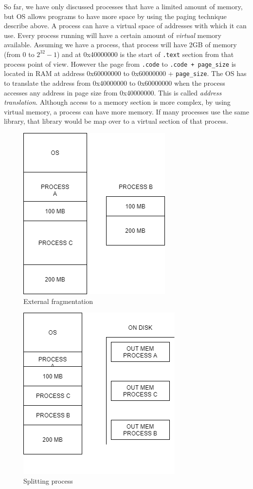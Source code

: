 So far, we have only discussed processes that have a limited amount of memory, but OS allows programs to have more space by using the paging technique describe above. A process can have a virtual space of addresses with which it can use. Every process running will have a certain amount of \textit{virtual} memory available. Assuming we have a process, that process will have 2GB of memory (from 0 to $2^{32}-1$) and at 0x40000000 is the start of \texttt{.text} section from that process point of view. However the page from \texttt{.code} to \texttt{.code + page\_size} is located in RAM at address 0x60000000 to 0x60000000 + \texttt{page\_size}. The OS has to translate the address from 0x40000000 to 0x60000000 when the process accesses any address in page size from 0x40000000. This is called \textit{address translation}. Although access to a memory section is more complex, by using virtual memory, a process can have more memory. If many processes use the same library, that library would be map over to a virtual section of that process.

\begin{figure}
\centering
\caption{External fragmentation}
\includegraphics[]{images/external_fragmentation.png}
\end{figure}

\begin{figure}
\centering
\caption{Splitting process}
\includegraphics[]{images/splitting_process.png}
\end{figure}

